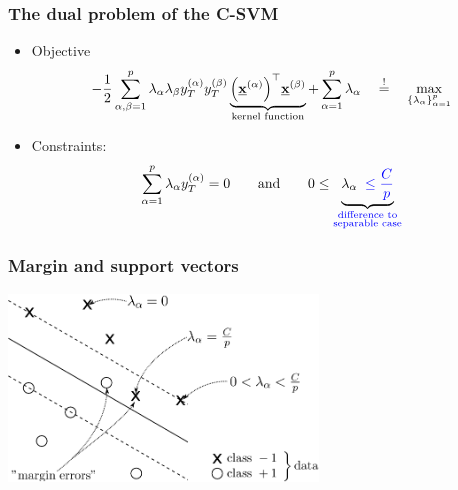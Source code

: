 \begin{frame}\frametitle{The dual problem of the C-SVM}

	\begin{itemize}
	\item Objective
		\begin{equation}
			-\frac{1}{2} \sum\limits_{\alpha,\beta = 1}^p \lambda_\alpha
				\lambda_\beta y_T^{(\alpha)} y_T^{(\beta)} 
				\underbrace{ \Big( \underline{\mathbf{x}}^{(\alpha)} \Big)^\top 
					\underline{\mathbf{x}}^{(\beta)}}_{\text{kernel function}}
				+ \sum\limits_{\alpha = 1}^p \lambda_\alpha 
				\quad \stackrel{\mathrm{!}}{=} \quad \max_{\{\lambda_\alpha\}_{\alpha=1}^p}
		\end{equation}
		
	\item Constraints:
		\begin{equation}
			\sum\limits_{\alpha = 1}^p \lambda_\alpha y_T^{(\alpha)} = 0 \qquad \text{and} \qquad
			0 \leq \underbrace{\lambda_\alpha 
				\;\;{\color{blue}\leq \frac{C}{p}} }_{
				\substack{ \color{blue} \text{difference to} \\
					\color{blue} \text{separable case}}} 
		\end{equation}
	\end{itemize}
\end{frame}

\begin{frame} \frametitle{Margin and support vectors}
	\begin{center} 
		\includegraphics[height=5cm]{img/section2_fig16_v2} 
	\end{center}
\end{frame}

